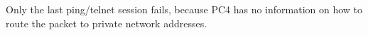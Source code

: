 Only the last ping/telnet session fails, because PC4 has no information on how to route the packet to private network addresses.
